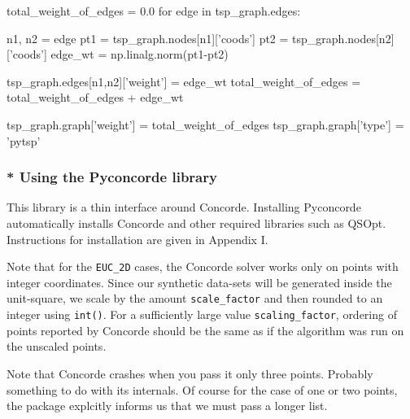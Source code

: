 \nwenddocs{}\endmoddef\nwstartdeflinemarkup{}\nwenddeflinemarkup
total_weight_of_edges = 0.0
for edge in tsp_graph.edges:

      n1, n2 = edge
      pt1 = tsp_graph.nodes[n1]['coods'] 
      pt2 = tsp_graph.nodes[n2]['coods']
      edge_wt = np.linalg.norm(pt1-pt2)

      tsp_graph.edges[n1,n2]['weight'] = edge_wt
      total_weight_of_edges = total_weight_of_edges + edge_wt 
\nwendcode{}\nwdocspar

\nwenddocs{}\endmoddef\nwstartdeflinemarkup{}\nwenddeflinemarkup
tsp_graph.graph['weight'] = total_weight_of_edges
tsp_graph.graph['type']   = 'pytsp'
\nwendcode{}\nwdocspar


\subsubsection{* Using the Pyconcorde library}

This library is a thin interface around Concorde. Installing Pyconcorde
automatically installs Concorde and other required libraries such as QSOpt. 
Instructions for installation are given in Appendix I.  

Note that for the \verb|EUC_2D| cases, the Concorde solver works only on points with integer coordinates. 
Since our synthetic data-sets will be generated inside the unit-square, we scale by the amount \verb|scale_factor| and then 
rounded to an integer using \verb|int()|. For a sufficiently large value \verb|scaling_factor|,  
ordering of points reported by Concorde should be the same as  if the algorithm was run on the 
unscaled points. 

Note that Concorde crashes when you pass it only three points. Probably something to do with
its internals. Of course for the case of one or two points, the package explcitly informs us that we must pass
a longer list. 

